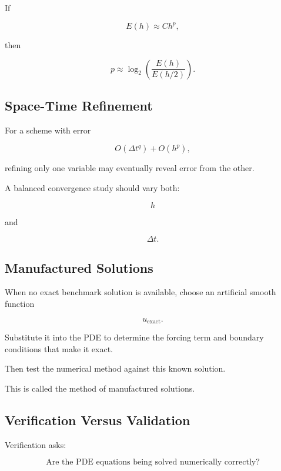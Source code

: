 If

\[
E(h)\approx Ch^p,
\]

then

\[
\boxed{
p
\approx
\log_2
\left(
\frac{
E(h)
}{
E(h/2)
}
\right).
}
\]

\subsection{Space-Time Refinement}
\label{subsec:space-time-refinement}

For a scheme with error

\[
\boxed{
O(\Delta t^q)
+
O(h^p),
}
\]

refining only one variable may eventually reveal error from the other.

A balanced convergence study should vary both:

\[
\boxed{
h
}
\]

and

\[
\boxed{
\Delta t.
}
\]

\subsection{Manufactured Solutions}
\label{subsec:manufactured-solutions}

When no exact benchmark solution is available, choose an artificial smooth
function

\[
u_{\mathrm{exact}}.
\]

Substitute it into the PDE to determine the forcing term and boundary
conditions that make it exact.

Then test the numerical method against this known solution.

This is called the method of manufactured solutions.

\subsection{Verification Versus Validation}
\label{subsec:pde-verification-validation}

Verification asks:

\[
\boxed{
\text{Are the PDE equations being solved numerically correctly?}
}
\]

